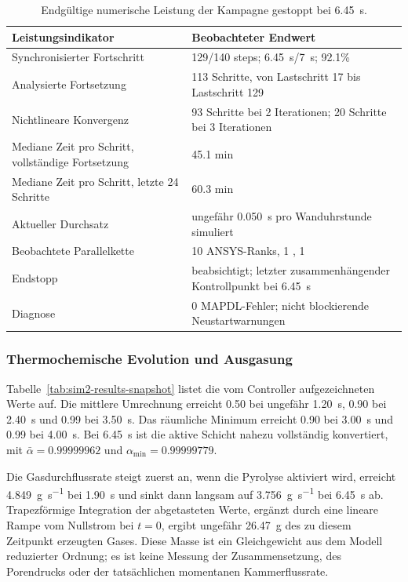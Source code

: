 \documentclass[oneside,openany]{amsdtx}
\begin{document}
\begin{table}[H]
\centering
\small
\renewcommand{\arraystretch}{1.15}
\begin{tabular}{L{0.43\textwidth}L{0.43\textwidth}}
\toprule
\textbf{Leistungsindikator} & \textbf{Beobachteter Endwert} \\
\midrule
Synchronisierter Fortschritt & 129/140 steps; \SI{6.45}{s}/\SI{7}{s}; 92.1\% \\
Analysierte Fortsetzung & 113 Schritte, von Lastschritt 17 bis Lastschritt 129 \\
Nichtlineare Konvergenz & 93 Schritte bei 2 Iterationen; 20 Schritte bei 3 Iterationen \\
Mediane Zeit pro Schritt, vollständige Fortsetzung & 45.1 min \\
Mediane Zeit pro Schritt, letzte 24 Schritte & 60.3 min \\
Aktueller Durchsatz & ungefähr \SI{0.050}{s} pro Wanduhrstunde simuliert \\
Beobachtete Parallelkette & 10 ANSYS-Ranks, 1 , 1  \\
Endstopp & beabsichtigt; letzter zusammenhängender Kontrollpunkt bei \SI{6.45}{s} \\
Diagnose & 0 MAPDL-Fehler; nicht blockierende Neustartwarnungen \\
\bottomrule
\end{tabular}
\caption{Endgültige numerische Leistung der Kampagne gestoppt bei \SI{6.45}{s}.}
\label{tab:sim2-performance}
\end{table}

\subsubsection{Thermochemische Evolution und Ausgasung}

Tabelle~\ref{tab:sim2-results-snapshot} listet die vom Controller aufgezeichneten Werte auf. Die mittlere Umrechnung erreicht 0.50 bei ungefähr \SI{1.20}{s}, 0.90 bei \SI{2.40}{s} und 0.99 bei \SI{3.50}{s}. Das räumliche Minimum erreicht 0.90 bei \SI{3.00}{s} und 0.99 bei \SI{4.00}{s}. Bei \SI{6.45}{s} ist die aktive Schicht nahezu vollständig konvertiert, mit \(\bar\alpha=0.99999962\) und \(\alpha_\mathrm{min}=0.99999779\).

Die Gasdurchflussrate steigt zuerst an, wenn die Pyrolyse aktiviert wird, erreicht \SI{4.849}{g.s^{-1}} bei \SI{1.90}{s} und sinkt dann langsam auf \SI{3.756}{g.s^{-1}} bei \SI{6.45}{s} ab. Trapezförmige Integration der abgetasteten Werte, ergänzt durch eine lineare Rampe vom Nullstrom bei \(t=0\), ergibt ungefähr \SI{26.47}{g} des zu diesem Zeitpunkt erzeugten Gases. Diese Masse ist ein Gleichgewicht aus dem Modell reduzierter Ordnung; es ist keine Messung der Zusammensetzung, des Porendrucks oder der tatsächlichen momentanen Kammerflussrate.
\end{document}
